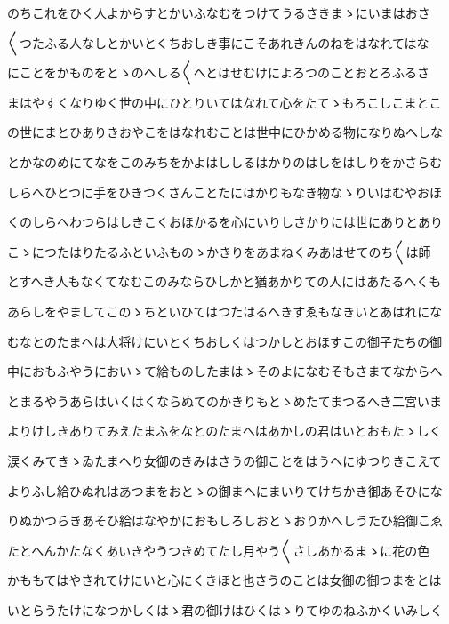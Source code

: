 \documentclass[a4paper,11pt,landscape]{ltjtarticle}
\begin{document}
\par\medskip
のちこれをひく人よからすとかいふなむをつけてうるさきまゝにいまはおさ
\par\medskip
〱つたふる人なしとかいとくちおしき事にこそあれきんのねをはなれてはな
\par\medskip
にことをかものをとゝのへしる〱へとはせむけによろつのことおとろふるさ
\par\medskip
まはやすくなりゆく世の中にひとりいてはなれて心をたてゝもろこしこまとこ
\par\medskip
の世にまとひありきおやこをはなれむことは世中にひかめる物になりぬへしな
\par\medskip
とかなのめにてなをこのみちをかよはししるはかりのはしをはしりをかさらむ
\par\medskip
しらへひとつに手をひきつくさんことたにはかりもなき物なゝりいはむやおほ
\par\medskip
くのしらへわつらはしきこくおほかるを心にいりしさかりには世にありとあり
\par\medskip
こゝにつたはりたるふといふものゝかきりをあまねくみあはせてのち〱は師
\par\medskip
とすへき人もなくてなむこのみならひしかと猶あかりての人にはあたるへくも
\par\medskip
あらしをやましてこのゝちといひてはつたはるへきすゑもなきいとあはれにな
\par\medskip
むなとのたまへは大将けにいとくちおしくはつかしとおほすこの御子たちの御
\par\medskip
中におもふやうにおいゝて給ものしたまはゝそのよになむそもさまてなからへ
\par\medskip
とまるやうあらはいくはくならぬてのかきりもとゝめたてまつるへき二宮いま
\par\medskip
よりけしきありてみえたまふをなとのたまへはあかしの君はいとおもたゝしく
\par\medskip
涙くみてきゝゐたまへり女御のきみはさうの御ことをはうへにゆつりきこえて
\par\medskip
よりふし給ひぬれはあつまをおとゝの御まへにまいりてけちかき御あそひにな
\par\medskip
りぬかつらきあそひ給はなやかにおもしろしおとゝおりかへしうたひ給御こゑ
\par\medskip
たとへんかたなくあいきやうつきめてたし月やう〱さしあかるまゝに花の色
\par\medskip
かももてはやされてけにいと心にくきほと也さうのことは女御の御つまをとは
\par\medskip
いとらうたけになつかしくはゝ君の御けはひくはゝりてゆのねふかくいみしく
\par\medskip
\end{document}
